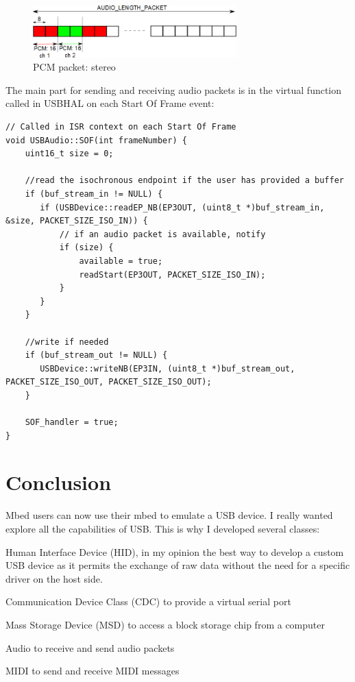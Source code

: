\documentclass[pdftex,10pt,a4paper]{report}
\newenvironment{packed_item}{
\begin{itemize}
  \setlength{\itemsep}{1pt}
  \setlength{\parskip}{0pt}
  \setlength{\parsep}{0pt}
}{\end{itemize}}
\begin{document}
\begin{figure}[h!]
		\centering
		\includegraphics[width=0.7\textwidth]{./pcm_stereo.png}
		\caption{PCM packet: stereo}
		\label{PCM packet: stereo}
\end{figure}


The main part for sending and receiving audio packets is in the virtual function called in USBHAL on each Start Of Frame event:
\begin{lstlisting}[label=Audio packets management in SOF events,caption=Audio packets management in SOF events]
// Called in ISR context on each Start Of Frame
void USBAudio::SOF(int frameNumber) {
    uint16_t size = 0;
    
    //read the isochronous endpoint if the user has provided a buffer
    if (buf_stream_in != NULL) {
       if (USBDevice::readEP_NB(EP3OUT, (uint8_t *)buf_stream_in, &size, PACKET_SIZE_ISO_IN)) {
           // if an audio packet is available, notify
           if (size) {
               available = true;
               readStart(EP3OUT, PACKET_SIZE_ISO_IN);
           }
       }
    }
    
    //write if needed
    if (buf_stream_out != NULL) {
       USBDevice::writeNB(EP3IN, (uint8_t *)buf_stream_out, PACKET_SIZE_ISO_OUT, PACKET_SIZE_ISO_OUT);
    }

    SOF_handler = true;
}
\end{lstlisting}

\section{Conclusion}
Mbed users can now use their mbed to emulate a USB device. I really wanted explore all the capabilities of USB. This is why I developed several classes:
\begin{packed_item}
	\item Human Interface Device (HID), in my opinion the best way to develop a custom USB device as it permits the exchange of raw data without the need for a specific driver on the host side.
	\item Communication Device Class (CDC) to provide a virtual serial port
	\item Mass Storage Device (MSD) to access a block storage chip from a computer
	\item Audio to receive and send audio packets
	\item MIDI to send and receive MIDI messages
\end{packed_item}
\end{document}
